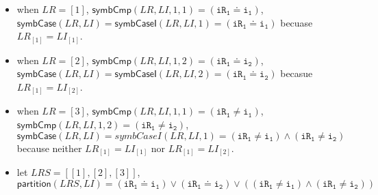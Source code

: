 \documentclass[conference]{IEEEtran}
\def \eqc {\doteq }
\def \iInv {i}
\def \iR {iR}
\newcommand{\forget}[1]{}
\begin{document}
{\begin{itemize}[leftmargin=8pt,noitemsep,nolistsep]
  \item when $LR=[1]$, $\mathsf{symbCmp}(LR,LI,1,1)=(\mathtt{\iR_1} \eqc \mathtt{\iInv_1})$, $\mathsf{symbCase}(LR,LI)=\mathsf{symbCaseI}(LR,LI,1)=(\mathtt{\iR_1} \eqc \mathtt{\iInv_1})$ becuase $LR_{[1]}=LI_{[1]}$.

  \item when $LR=[2]$, $\mathsf{symbCmp}(LR,LI,1,2)= (\mathtt{\iR_1} \eqc \mathtt{\iInv_2})$, $\mathsf{symbCase}(LR,LI)=\mathsf{symbCaseI}(LR,LI,2)=(\mathtt{\iR_1} \eqc \mathtt{\iInv_2})$ becasue $LR_{[1]}=LI_{[2]}$.


 \item when  $LR=[3]$, $\mathsf{symbCmp}(LR,LI,1,1)=(\mathtt{\iR_1} \ne \mathtt{\iInv_1})$, $\mathsf{symbCmp}(LR,LI,1,2) = (\mathtt{\iR_1} \ne \mathtt{\iInv_2})$, $\mathsf{symbCase}(LR,LI)=symbCaseI(LR,LI,1)= (\mathtt{\iR_1} \ne \mathtt{\iInv_1}) \wedge  (\mathtt{\iR_1} \ne \mathtt{\iInv_2})$ because neither $LR_{[1]}=LI_{[1]}$ nor $LR_{[1]}=LI_{[2]}$.

  \item let $LRS=[[1],[2],[3]]$, $\mathsf{partition}(LRS,LI)= (\mathtt{\iR_1} \eqc \mathtt{\iInv_1}) \vee (\mathtt{\iR_1} \eqc \mathtt{\iInv_2}) \vee ( (\mathtt{\iR_1} \ne \mathtt{\iInv_1}) \wedge  (\mathtt{\iR_1} \ne \mathtt{\iInv_2}))$
\end{itemize}

\forget{If we see a line  in table \ref{table:groundCausalRelation} as a concrete test case for some concrete causal relation,  then $\mathsf{symbCase}(LR, LI)$ is an abstraction predicate to generalize the concrete case. Namely, if we transform $\mathsf{symbCase}(LR, LI)$ by substituting $\mathtt{\iInv_i}$ with $LI_{[i]}$, and $\mathtt{\iR_j}$ with $LR_{[j]}$, the result is a tautlogy.} %

}
\end{document}
